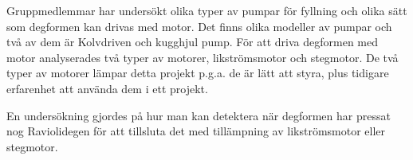 Gruppmedlemmar har undersökt olika typer av pumpar för fyllning och olika sätt som degformen kan drivas med motor. Det finns olika modeller av pumpar och två av dem är Kolvdriven och kugghjul pump. För att driva degformen med motor analyserades två typer av motorer, likströmsmotor och stegmotor. De två typer av motorer lämpar detta projekt p.g.a. de är lätt att styra, plus tidigare erfarenhet att använda dem i ett projekt.

En undersökning gjordes på hur man kan detektera när degformen har pressat nog Raviolidegen för att tillsluta det med tillämpning av likströmsmotor eller stegmotor.
